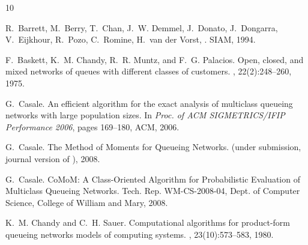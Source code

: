 \documentclass[journal,twocolumn,9.5pt]{IEEEtran}
\begin{document}

%
\begin{thebibliography}{10}


R.~Barrett, M.~Berry, T.~Chan, J.~W. Demmel, J.~Donato, J.~Dongarra, V.~Eijkhour, R.~Pozo, C.~Romine, H.~van der Vorst,
.
\newblock SIAM, 1994.

F.~Baskett, K.~M. Chandy, R.~R. Muntz, and F.~G. Palacios.
\newblock Open, closed, and mixed networks of queues with different classes of customers.
, 22(2):248--260, 1975.
%


G.~Casale.
\newblock An efficient algorithm for the exact analysis of multiclass queueing
  networks with large population sizes.
\newblock In {\em Proc. of ACM SIGMETRICS/IFIP Performance 2006},
  pages 169--180, ACM, 2006.


G.~Casale.
\newblock The Method of Moments for Queueing Networks.
\newblock (under submission, journal version of \cite{Cas06b}), 2008.

G.~Casale.
\newblock CoMoM: A Class-Oriented Algorithm for Probabilistic
Evaluation of Multiclass Queueing Networks.
\newblock Tech. Rep. WM-CS-2008-04, Dept. of Computer Science, College of William and Mary, 2008.


K.~M. Chandy and C.~H. Sauer.
\newblock Computational algorithms for product-form queueing networks models of
  computing systems.
, 23(10):573--583, 1980.


\end{thebibliography}
\end{document}
